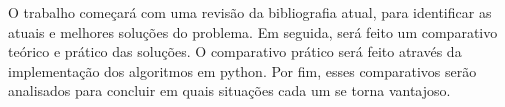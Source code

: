 O trabalho começará com uma revisão da bibliografia atual, para identificar as atuais e melhores soluções do problema.
Em seguida, será feito um comparativo teórico e prático das soluções.
O comparativo prático será feito através da implementação dos algoritmos em python.
Por fim, esses comparativos serão analisados para concluir em quais situações cada um se torna vantajoso.
